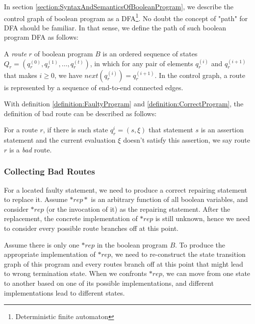 In section \ref{section:SyntaxAndSemanticsOfBooleanProgram}, we describe the control graph of boolean program as a DFA\footnote{Deterministic finite automaton}. No doubt the concept of "path" for DFA should be familiar. In that sense, we define the path of such boolean program DFA as follows:

\begin{definition}
A {\it route} $r$ of boolean program $B$ is an ordered sequence of states $Q_{r}=(q_{r}^{(0)},q_{r}^{(1)},\dots,q_{r}^{(t)})$, in which for any pair of elements $q_{r}^{(i)}$ and $q_{r}^{(i + 1)}$ that makes $i \ge 0$, we have $next(q_{r}^{(i)}) = q_{r}^{(i + 1)}$. In the control graph, a route is represented by a sequence of end-to-end connected edges.
\end{definition}

With definition \ref{definition:FaultyProgram} and \ref{definition:CorrectProgram}, the definition of bad route can be described as follows:

\begin{definition}
For a route $r$, if there is such state $q_r^{i} = (s,\xi)$ that statement $s$ is an assertion statement and the current evaluation $\xi$ doesn't satisfy this assertion, we say route $r$ is a {\it bad} route.
\end{definition}

\subsubsection{Collecting Bad Routes}
\label{section:CollectingBadRoutes}
For a located faulty statement, we need to produce a correct repairing statement to replace it.
Assume $*rep*$ is an arbitrary function of all boolean variables, and consider $*rep$ (or the invocation of it) as the repairing statement.
After the replacement, the concrete implementation of $*rep$ is still unknown, hence we need to consider every possible route branches off at this point.

Assume there is only one $*rep$ in the boolean program $B$. To produce the appropriate implementation of $*rep$, we need to re-construct the state transition graph of this program and every routes branch off at this point
that might lead to wrong termination state.
When we confronts $*rep$, we can move from one state to another based on one of its possible implementations, and different implementations lead to different states.

